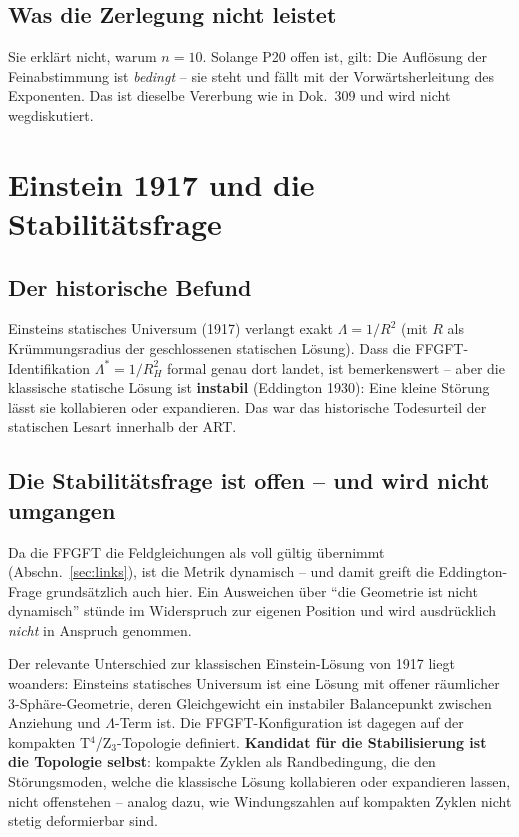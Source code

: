 \documentclass[11pt]{report}
\begin{document}
\section{Was die Zerlegung nicht leistet}

Sie erklärt nicht, warum $n=10$. Solange P20 offen ist, gilt: Die
Auflösung der Feinabstimmung ist \emph{bedingt} -- sie steht und
fällt mit der Vorwärtsherleitung des Exponenten. Das ist dieselbe
Vererbung wie in Dok.~309 und wird nicht wegdiskutiert.

\chapter{Einstein 1917 und die Stabilitätsfrage}
\label{ch:einstein1917}

\section{Der historische Befund}

Einsteins statisches Universum (1917) verlangt exakt
$\Lambda = 1/R^2$ (mit $R$ als Krümmungsradius der geschlossenen
statischen Lösung). Dass die FFGFT-Identifikation
$\Lambda^{*} = 1/R_H^2$ formal genau dort landet, ist bemerkenswert --
aber die klassische statische Lösung ist \textbf{instabil}
(Eddington 1930): Eine kleine Störung lässt sie kollabieren oder
expandieren. Das war das historische Todesurteil der statischen
Lesart innerhalb der ART.

\section{Die Stabilitätsfrage ist offen -- und wird nicht umgangen}
\label{sec:stabfrage}

Da die FFGFT die Feldgleichungen als voll gültig übernimmt
(Abschn.~\ref{sec:links}), ist die Metrik dynamisch -- und damit greift die
Eddington-Frage grundsätzlich auch hier. Ein Ausweichen über
\enquote{die Geometrie ist nicht dynamisch} stünde im Widerspruch
zur eigenen Position und wird ausdrücklich \emph{nicht} in Anspruch
genommen.

Der relevante Unterschied zur klassischen Einstein-Lösung von 1917
liegt woanders: Einsteins statisches Universum ist eine Lösung mit
offener räumlicher 3-Sphäre-Geometrie, deren Gleichgewicht ein
instabiler Balancepunkt zwischen Anziehung und $\Lambda$-Term ist.
Die FFGFT-Konfiguration ist dagegen auf der kompakten
T$^4$/Z$_3$-Topologie definiert. \textbf{Kandidat für die
Stabilisierung ist die Topologie selbst}: kompakte Zyklen als
Randbedingung, die den Störungsmoden, welche die klassische Lösung
kollabieren oder expandieren lassen, nicht offenstehen -- analog
dazu, wie Windungszahlen auf kompakten Zyklen nicht stetig
deformierbar sind.
\end{document}
